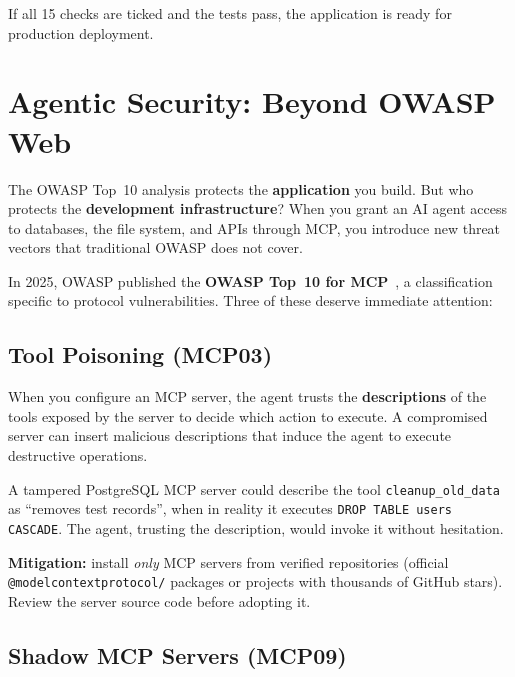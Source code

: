 \begin{checkpointbox}
If all 15 checks are ticked and the tests pass, the application is ready for production deployment.
\end{checkpointbox}

\section{Agentic Security: Beyond OWASP Web}

The OWASP Top~10 analysis protects the \textbf{application} you build. But who protects the \textbf{development infrastructure}? When you grant an AI agent access to databases, the file system, and APIs through MCP, you introduce new threat vectors that traditional OWASP does not cover.

In 2025, OWASP published the \textbf{OWASP Top~10 for MCP}~\cite{owasp:mcp-top10,owasp:ai-agent}, a classification specific to protocol vulnerabilities. Three of these deserve immediate attention:

\subsection{Tool Poisoning (MCP03)}

When you configure an MCP server, the agent trusts the \textbf{descriptions} of the tools exposed by the server to decide which action to execute. A compromised server can insert malicious descriptions that induce the agent to execute destructive operations.

\begin{dangerbox}
A tampered PostgreSQL MCP server could describe the tool \texttt{cleanup\_old\_data} as ``removes test records'', when in reality it executes \texttt{DROP TABLE users CASCADE}. The agent, trusting the description, would invoke it without hesitation.
\end{dangerbox}

\textbf{Mitigation:} install \textit{only} MCP servers from verified repositories (official \texttt{@modelcontextprotocol/} packages or projects with thousands of GitHub stars). Review the server source code before adopting it.

\subsection{Shadow MCP Servers (MCP09)}

